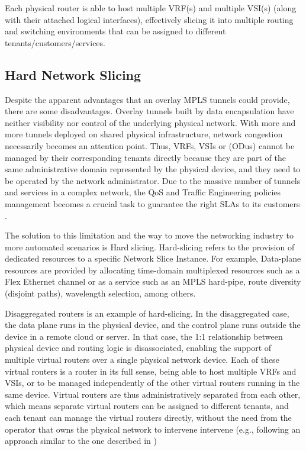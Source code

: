 \documentclass[journal,article,submit,moreauthors,pdftex]{Definitions/mdpi}
\begin{document}
Each physical router is able to host multiple VRF(s) and multiple VSI(s) (along with their attached logical interfaces), effectively slicing it into multiple routing and switching environments that can be assigned to different tenants/customers/services.


\subsection{Hard Network Slicing}
\label{sec:hard}

Despite the apparent advantages that an overlay MPLS tunnels could provide, there are some disadvantages. Overlay tunnels built by data encapsulation have neither visibility nor control of the underlying physical network. With more and more tunnels deployed on shared physical infrastructure, network congestion necessarily becomes an attention point.  Thus, VRFs, VSIs or  (ODus) cannot be managed by their corresponding tenants directly because they are part of the same administrative domain represented by the physical device, and they need to be operated by the network administrator. Due to the massive number of tunnels and services in a complex network, the QoS and Traffic Engineering policies management becomes a crucial task to guarantee the right SLAs to its customers \cite{huang20205g,marotta2020reliable}.

The solution to this limitation and the way to move the networking industry to more automated scenarios is Hard slicing. Hard-slicing refers to the provision of dedicated resources to a specific Network Slice Instance. For example, Data-plane resources are provided by allocating time-domain multiplexed resources such as a Flex Ethernet channel or as a service such as an MPLS hard-pipe, route diversity (disjoint paths), wavelength selection, among others.  

Disaggregated routers is an example of hard-slicing. In the disaggregated case, the data plane runs in the physical device, and the control plane runs outside the device in a remote cloud or server. In that case, the 1:1 relationship between physical device and routing logic is disassociated, enabling the support of multiple virtual routers over a single physical network device. Each of these virtual routers is a router in its full sense, being able to host multiple VRFs and VSIs, or to be managed independently of the other virtual routers running in the same device. Virtual routers are thus administratively separated from each other, which means separate virtual routers can be assigned to different tenants, and each tenant can manage the virtual routers directly, without the need from the operator that owns the physical network to intervene intervene (e.g., following an approach similar to the one described in \cite{contreras2021architecture})
\end{document}
